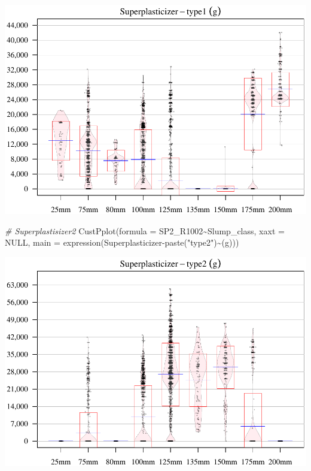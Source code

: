 \documentclass[
]{article}
\newenvironment{Shaded}{\begin{snugshade}}{\end{snugshade}}
\newcommand{\AttributeTok}[1]{\textcolor[rgb]{0.77,0.63,0.00}{#1}}
\newcommand{\CommentTok}[1]{\textcolor[rgb]{0.56,0.35,0.01}{\textit{#1}}}
\newcommand{\ConstantTok}[1]{\textcolor[rgb]{0.00,0.00,0.00}{#1}}
\newcommand{\FunctionTok}[1]{\textcolor[rgb]{0.00,0.00,0.00}{#1}}
\newcommand{\NormalTok}[1]{#1}
\newcommand{\SpecialCharTok}[1]{\textcolor[rgb]{0.00,0.00,0.00}{#1}}
\newcommand{\StringTok}[1]{\textcolor[rgb]{0.31,0.60,0.02}{#1}}
\begin{document}
\begin{center}\includegraphics{sl-inf-cairs-2301_files/figure-latex/dataInsights-9} \end{center}

\begin{Shaded}
\begin{Highlighting}[]
\CommentTok{\# Superplastisizer2}
\FunctionTok{CustPplot}\NormalTok{(}\AttributeTok{formula =}\NormalTok{ SP2\_R1002}\SpecialCharTok{\textasciitilde{}}\NormalTok{Slump\_class, }\AttributeTok{xaxt =} \ConstantTok{NULL}\NormalTok{,}
          \AttributeTok{main =} \FunctionTok{expression}\NormalTok{(Superplasticizer}\SpecialCharTok{{-}}\FunctionTok{paste}\NormalTok{(}\StringTok{"type2"}\NormalTok{)}\SpecialCharTok{\textasciitilde{}}\NormalTok{(g)))}
\end{Highlighting}
\end{Shaded}

\begin{center}\includegraphics{sl-inf-cairs-2301_files/figure-latex/dataInsights-10} \end{center}
\end{document}
